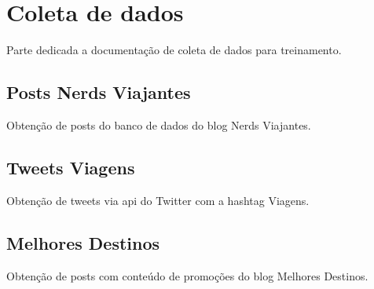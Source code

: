 \section{Coleta de dados}

Parte dedicada a documentação de coleta de dados para treinamento.

\subsection{Posts Nerds Viajantes}

Obtenção de posts do banco de dados do blog Nerds Viajantes.

\subsection{Tweets Viagens}

Obtenção de tweets via api do Twitter com a hashtag Viagens.

\subsection{Melhores Destinos}

Obtenção de posts com conteúdo de promoções do blog Melhores Destinos.